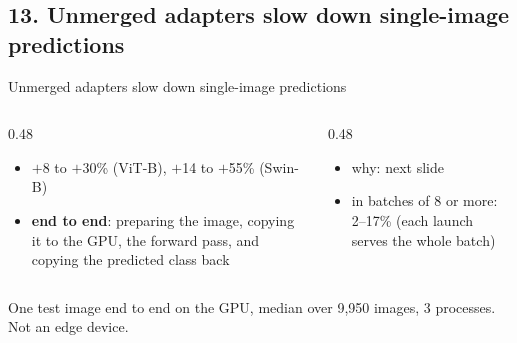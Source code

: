 \documentclass[aspectratio=169,11pt]{beamer}
\newcommand{\src}[1]{\par\vfill{\tiny\color{cGrey}#1\par}}
\begin{document}
\subsection{13. Unmerged adapters slow down single-image predictions}
\begin{frame}{Unmerged adapters slow down single-image predictions}
\vspace{-1mm}
{\centering\par}
\vspace{-1mm}
\begin{columns}[T]
\begin{column}{0.48\textwidth}
\footnotesize
\begin{itemize}
  \item $+$8 to $+$30\% (ViT-B), $+$14 to $+$55\% (Swin-B)
  \item \textbf{end to end}: preparing the image, copying it to the GPU, the forward pass, and copying the predicted class back
\end{itemize}
\end{column}
\begin{column}{0.48\textwidth}
\footnotesize
\begin{itemize}
  \item why: next slide
  \item in batches of 8 or more: 2--17\% (each launch serves the whole batch)
\end{itemize}
\end{column}
\end{columns}
\src{One test image end to end on the GPU, median over 9,950 images, 3 processes. Not an edge device.}
\end{frame}

\end{document}
